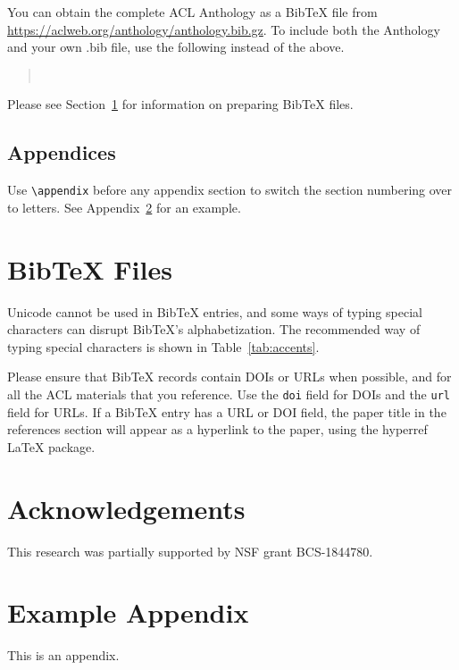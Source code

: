 \documentclass[11pt]{article}
\begin{document}
You can obtain the complete ACL Anthology as a Bib\TeX{} file from \url{https://aclweb.org/anthology/anthology.bib.gz}.
To include both the Anthology and your own .bib file, use the following instead of the above.
\begin{quote}
\begin{verbatim}


\end{verbatim}
\end{quote}

Please see Section~\ref{sec:bibtex} for information on preparing Bib\TeX{} files.

\subsection{Appendices}

Use \verb|\appendix| before any appendix section to switch the section numbering over to letters. See Appendix~\ref{sec:appendix} for an example.

\section{Bib\TeX{} Files}
\label{sec:bibtex}

Unicode cannot be used in Bib\TeX{} entries, and some ways of typing special characters can disrupt Bib\TeX's alphabetization. The recommended way of typing special characters is shown in Table~\ref{tab:accents}.

Please ensure that Bib\TeX{} records contain DOIs or URLs when possible, and for all the ACL materials that you reference.
Use the \verb|doi| field for DOIs and the \verb|url| field for URLs.
If a Bib\TeX{} entry has a URL or DOI field, the paper title in the references section will appear as a hyperlink to the paper, using the hyperref \LaTeX{} package.

\section*{Acknowledgements}

This research was partially supported by NSF grant BCS-1844780.






\appendix

\section{Example Appendix}
\label{sec:appendix}

This is an appendix.
\end{document}
